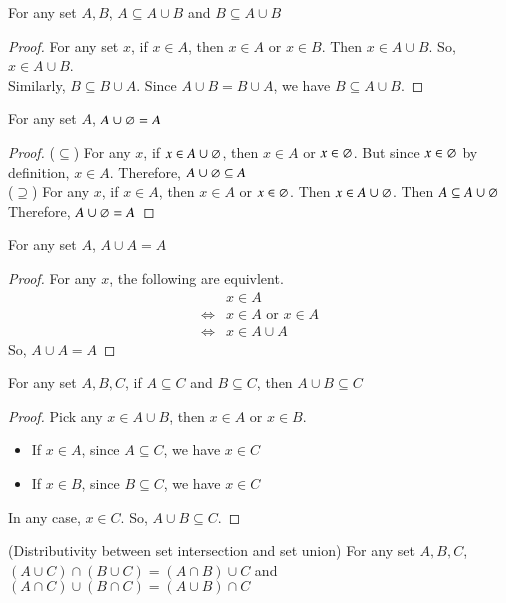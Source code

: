\begin{prop}
    {For any set $A,B$, $A\subseteq A\cup B$ and $B\subseteq A\cup B$}
\end{prop}
\begin{proof}
    For any set $x$, if $x\in A$, then $x\in A$ or $x\in B$. Then $x\in A\cup B$. So, $x\in A\cup B$.\\
    Similarly, $B\subseteq B\cup A$. Since $A\cup B = B\cup A$, we have $B\subseteq A\cup B$.
\end{proof}
\begin{prop}
    {For any set $A$, $A\cup\varnothing = A$}
\end{prop}
\begin{proof}
    ($\subseteq$) For any $x$, if $x\in A\cup \varnothing$, then $x\in A$ or $x\in \varnothing$. But since $x\in\varnothing$ by definition, $x\in A$. Therefore, $A\cup \varnothing\subseteq A$\\
    ($\supseteq$) For any $x$, if $x\in A$, then $x\in A$ or $x\in \varnothing$. Then $x\in A\cup \varnothing$. Then $A\subseteq A\cup\varnothing$\\
    Therefore, $A\cup\varnothing = A$
\end{proof}
\begin{prop}
    {For any set $A$, $A\cup A = A$}
\end{prop}
\begin{proof}
    For any $x$, the following are equivlent. 
    \begin{align*}
        & x\in A\\
        \Leftrightarrow & x\in A \text{ or }x\in A\\
        \Leftrightarrow & x\in A\cup A
    \end{align*}
    So, $A\cup A = A$
\end{proof}
\begin{prop}
    {For any set $A,B,C$, if $A\subseteq C$ and $B\subseteq C$, then $A\cup B\subseteq C$}\
\end{prop}
\begin{proof}
    Pick any $x\in A\cup B$, then $x\in A$ or $x\in B$. 
    \begin{itemize}
        \item If $x\in A$, since $A\subseteq C$, we have $x\in C$
        \item If $x\in B$, since $B\subseteq C$, we have $x\in C$
    \end{itemize}
    In any case, $x\in C$. So, $A\cup B\subseteq C$.
\end{proof}
\begin{prop}
    {(Distributivity between set intersection and set union) For any set $A,B,C$, $(A\cup C)\cap(B\cup C) = (A\cap B)\cup C$ and $(A\cap C)\cup (B\cap C) = (A\cup B) \cap C$}
\end{prop}
